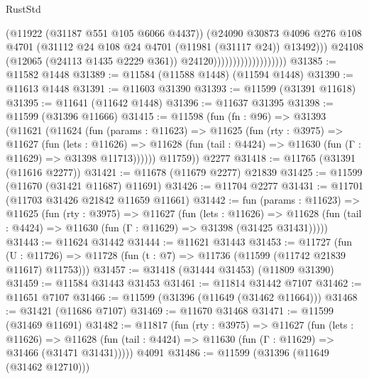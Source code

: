 \begin{lexlean}{RustStd}
\begin{coremodule}
                                            (@11922 (@31187 @551 @105 @6066 @4437))
                                            (@24090
                                              @30873
                                              @4096
                                              @276
                                              @108
                                              @4701
                                              (@31112
                                                @24
                                                @108
                                                @24
                                                @4701
                                                (@11981 (@31117 @24))
                                                @13492)))
                                          @24108
                                          (@12065 (@24113 @1435 @2229 @361))
                                          @24120)))))))))))))))))))
@31385 := @11582 @1448
@31389 := @11584 (@11588 @1448) (@11594 @1448)
@31390 := @11613 @1448
@31391 := @11603 @31390
@31393 := @11599 (@31391 @11618)
@31395 := @11641 (@11642 @1448)
@31396 := @11637 @31395
@31398 := @11599 (@31396 @11666)
@31415 := @11598
    (fun (fn : @96) =>
    @31393
      (@11621
        (@11624
          (fun (params : @11623) =>
          @11625
            (fun (rty : @3975) =>
            @11627
              (fun (lets : @11626) =>
              @11628 (fun (tail : @4424) => @11630 (fun (Γ : @11629) => @31398 @11713))))))
        @11759))
    @2277
@31418 := @11765 (@31391 (@11616 @2277))
@31421 := @11678 (@11679 @2277) @21839
@31425 := @11599 (@11670 (@31421 @11687) @11691)
@31426 := @11704 @2277
@31431 := @11701 (@11703 @31426 @21842 @11659 @11661)
@31442 := fun (params : @11623) =>
  @11625
    (fun (rty : @3975) =>
    @11627
      (fun (lets : @11626) =>
      @11628 (fun (tail : @4424) => @11630 (fun (Γ : @11629) => @31398 (@31425 @31431)))))
@31443 := @11624 @31442
@31444 := @11621 @31443
@31453 := @11727
    (fun (U : @11726) => @11728 (fun (t : @7) => @11736 (@11599 (@11742 @21839 @11617) @11753)))
@31457 := @31418 (@31444 @31453) (@11809 @31390)
@31459 := @11584 @31443 @31453
@31461 := @11814 @31442 @7107
@31462 := @11651 @7107
@31466 := @11599 (@31396 (@11649 (@31462 @11664)))
@31468 := @31421 (@11686 @7107)
@31469 := @11670 @31468
@31471 := @11599 (@31469 @11691)
@31482 := @11817
    (fun (rty : @3975) =>
    @11627
      (fun (lets : @11626) =>
      @11628 (fun (tail : @4424) => @11630 (fun (Γ : @11629) => @31466 (@31471 @31431)))))
    @4091
@31486 := @11599 (@31396 (@11649 (@31462 @12710)))

\end{coremodule}
\end{lexlean}
